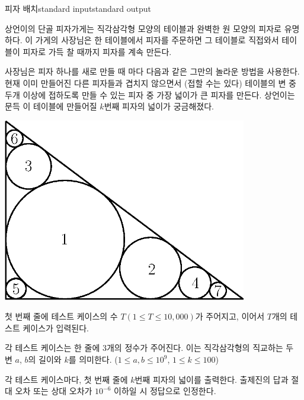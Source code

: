 \begin{problem}{피자 배치}{standard input}{standard output}

상언이의 단골 피자가게는 직각삼각형 모양의 테이블과 완벽한 원 모양의 피자로 유명하다. 이 가게의 사장님은 한 테이블에서 피자를 주문하면 그 테이블로 직접와서 테이블이 피자로 가득 찰 때까지 피자를 계속 만든다.

사장님은 피자 하나를 새로 만들 때 마다 다음과 같은 그만의 놀라운 방법을 사용한다. 현재 이미 만들어진 다른 피자들과 겹치지 않으면서 (접할 수는 있다) 테이블의 변 중 두개 이상에 접하도록 만들 수 있는 피자 중 가장 넓이가 큰 피자를 만든다. 상언이는 문득 이 테이블에 만들어질 $k$번째 피자의 넓이가 궁금해졌다.

\begin{center}
  \includegraphics[width=0.8\textwidth]{pizza.eps}
\end{center}

\InputFile
첫 번째 줄에 테스트 케이스의 수 $T (1 \le T \le 10,000)$가 주어지고, 이어서 $T$개의 테스트 케이스가 입력된다.

각 테스트 케이스는 한 줄에 3개의 정수가 주어진다. 이는 직각삼각형의 직교하는 두 변 $a$, $b$의 길이와 $k$를 의미한다. ($1 \le a, b \le 10^9$, $1 \le k \le 100$)

\OutputFile
각 테스트 케이스마다, 첫 번째 줄에 $k$번째 피자의 넓이를 출력한다. 출제진의 답과 절대 오차 또는 상대 오차가 $10^{-6}$ 이하일 시 정답으로 인정한다.

\Example

\begin{example}
%
\end{example}

\end{problem}
